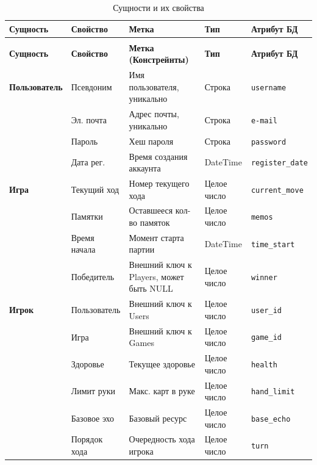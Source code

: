 \begin{longtable}{|>{\raggedright\arraybackslash}p{}|>{\raggedright\arraybackslash}p{}|>{\raggedright\arraybackslash}p{}|>{\raggedright\arraybackslash}p{}|>{\raggedright\arraybackslash}p{}|}
	\caption{Сущности и их свойства} \label{tbl:data}
	\\
	\hline
	\textbf{Сущность} & \textbf{Свойство} & \textbf{Метка} & \textbf{Тип} & \textbf{Атрибут БД} \\
	\hline
	\endfirsthead
	\caption{Сущности и их свойства}
	\\
	\hline
	\textbf{Сущность} & \textbf{Свойство} & \textbf{Метка (Констрейнты)} & \textbf{Тип} & \textbf{Атрибут БД} \\
	\hline
	\endhead
	\hline
	\endfoot
	\endlastfoot
	
	\textbf{Пользователь}
	& Псевдоним & Имя пользователя, уникально & Строка & \texttt{username} \\
	\cline{2-5}
	& Эл. почта & Адрес почты, уникально & Строка & \texttt{e-mail} \\
	\cline{2-5}
	& Пароль & Хеш пароля & Строка & \texttt{password} \\
	\cline{2-5}
	& Дата рег. & Время создания аккаунта & DateTime & \texttt{register\_date} \\
	\hline
	
	\textbf{Игра}
	& Текущий ход & Номер текущего хода & Целое число & \texttt{current\_move} \\
	\cline{2-5}
	& Памятки & Оставшееся кол-во памяток & Целое число & \texttt{memos} \\
	\cline{2-5}
	& Время начала & Момент старта партии & DateTime & \texttt{time\_start} \\
	\cline{2-5}
	& Победитель & Внешний ключ к Players, может быть NULL & Целое число & \texttt{winner} \\
	\hline
	
	\textbf{Игрок}
	& Пользователь & Внешний ключ к Users & Целое число & \texttt{user\_id} \\
	\cline{2-5}
	& Игра & Внешний ключ к Games & Целое число & \texttt{game\_id} \\
	\cline{2-5}
	& Здоровье & Текущее здоровье& Целое число & \texttt{health} \\
	\cline{2-5}
	& Лимит руки & Макс. карт в руке & Целое число & \texttt{hand\_limit} \\
	\cline{2-5}
	& Базовое эхо & Базовый ресурс 
	& Целое число & \texttt{base\_echo} \\
	\cline{2-5}
	& Порядок хода & Очередность хода игрока & Целое число & \texttt{turn} \\
	\hline
	

\end{longtable}
